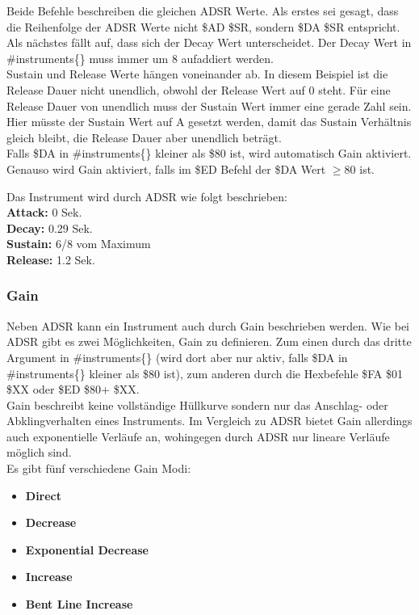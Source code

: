 Beide Befehle beschreiben die gleichen ADSR Werte. Als erstes sei gesagt, dass die Reihenfolge der ADSR Werte nicht \$AD \$SR, sondern \$DA \$SR entspricht. \\
Als nächstes fällt auf, dass sich der Decay Wert unterscheidet. Der Decay Wert in \#instruments\{\} muss immer um 8 aufaddiert werden. \\
Sustain und Release Werte hängen voneinander ab. In diesem Beispiel ist die Release Dauer nicht unendlich, obwohl der Release Wert auf 0 steht. Für eine Release Dauer von unendlich muss der Sustain Wert immer eine gerade Zahl sein. Hier müsste der Sustain Wert auf A gesetzt werden, damit das Sustain Verhältnis gleich bleibt, die Release Dauer aber unendlich beträgt. \\
Falls \$DA in \#instruments\{\} kleiner als \$80 ist, wird automatisch Gain aktiviert. Genauso wird Gain aktiviert, falls im \$ED Befehl der \$DA Wert $\geq 80$ ist.

\bigskip

Das Instrument wird durch ADSR wie folgt beschrieben: \\
\textbf{Attack:} 0 Sek. \\
\textbf{Decay:} 0.29 Sek. \\
\textbf{Sustain:} 6/8 vom Maximum \\
\textbf{Release:} 1.2 Sek.



\subsubsection{Gain}
\label{sec:Gain}

Neben ADSR kann ein Instrument auch durch Gain beschrieben werden. Wie bei ADSR gibt es zwei Möglichkeiten, Gain zu definieren. Zum einen durch das dritte Argument in \#instruments\{\} (wird dort aber nur aktiv, falls \$DA in \#instruments\{\} kleiner als \$80 ist), zum anderen durch die Hexbefehle \$FA \$01 \$XX oder \$ED \$80+ \$XX. \\
Gain beschreibt keine vollständige Hüllkurve sondern nur das Anschlag- oder Abklingverhalten eines Instruments. Im Vergleich zu ADSR bietet Gain allerdings auch exponentielle Verläufe an, wohingegen durch ADSR nur lineare Verläufe möglich sind. \\
Es gibt fünf verschiedene Gain Modi:

\medskip

\begin{itemize}
	\item \textbf{Direct}
	\item \textbf{Decrease}
	\item \textbf{Exponential Decrease}
	\item \textbf{Increase}
	\item \textbf{Bent Line Increase}
\end{itemize}


